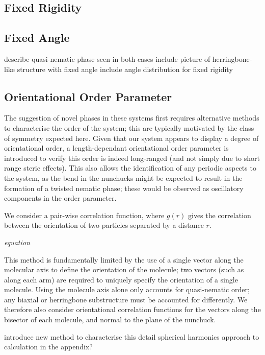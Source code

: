 \documentclass[11pt, a4paper]{article} %
\begin{document}
\subsection{Fixed Rigidity}

\subsection{Fixed Angle}

describe quasi-nematic phase seen in both cases
include picture of herringbone-like structure with fixed angle
include angle distribution for fixed rigidity

\subsection{Orientational Order Parameter}
The suggestion of novel phases in these systems first requires alternative methods to characterise the order of the system; this are typically motivated by the class of symmetry expected here. Given that our system appears to display a degree of orientational order, a length-dependant orientational order parameter is introduced to verify this order is indeed long-ranged (and not simply due to short range steric effects). This also allows the identification of any periodic aspects to the system, as the bend in the nunchucks might be expected to result in the formation of a twisted nematic phase; these would be observed as oscillatory components in the order parameter.

We consider a pair-wise correlation function, where $g(r)$ gives the correlation between the orientation of two particles separated by a distance $r$. 

\textit{equation}

This method is fundamentally limited by the use of a single vector along the molecular axis to define the orientation of the molecule; two vectors (such as along each arm) are required to uniquely specify the orientation of a single molecule. Using the molecule axis alone only accounts for quasi-nematic order; any biaxial or herringbone substructure must be accounted for differently. We therefore also consider orientational correlation functions for the vectors along the bisector of each molecule, and normal to the plane of the nunchuck.



introduce new method to characterise this
detail spherical harmonics approach to calculation in the appendix?
\end{document}
